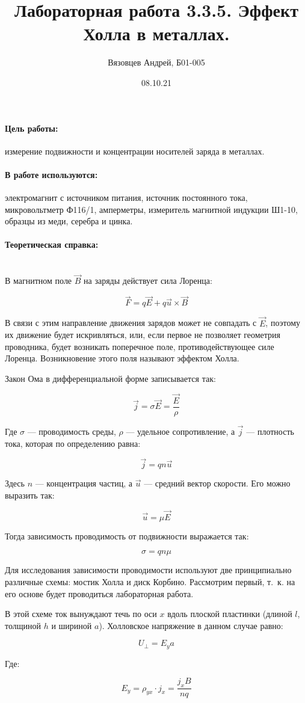 \documentclass[a4paper, 12pt]{article}
\author{Вязовцев Андрей, Б01-005}
\date{08.10.21}
\title{Лабораторная работа 3.3.5. Эффект Холла в металлах.}
\newcommand{\parag}[1]{\paragraph*{#1:}}
\begin{document}
\maketitle

\parag {Цель работы} измерение подвижности и концентрации носителей заряда в металлах.

\parag {В работе используются} электромагнит с источником питания, источник постоянного тока, микровольтметр Ф116/1, амперметры, измеритель магнитной индукции Ш1-10, образцы из меди, серебра и цинка.

\parag {Теоретическая справка} ~\\

В магнитном поле $\vec{B}$ на заряды действует сила Лоренца:

\[
    \vec{F} = q\vec{E} + q\vec{u} \times \vec{B}
\]

В связи с этим направление движения зарядов может не совпадать с $\vec{E}$, поэтому их движение будет искривляться, или, если первое не позволяет геометрия проводника, будет возникать поперечное поле, противодействующее силе Лоренца. Возникновение этого поля называют эффектом Холла.

Закон Ома в дифференциальной форме записывается так:

\[
    \vec{j} = \sigma \vec{E} = \frac{\vec{E}}{\rho}
\]

Где $\sigma$ --- проводимость среды, $\rho$ --- удельное сопротивление, а $\vec{j}$ --- плотность тока, которая по определению равна:

\[
    \vec{j} = q n \vec{u}
\]

Здесь $n$ --- концентрация частиц, а $\vec{u}$ --- средний вектор скорости. Его можно выразить так:

\[
    \vec{u} = \mu \vec{E}
\]

Тогда зависимость проводимость от подвижности выражается так:

\[
    \sigma = q n \mu
\]

Для исследования зависимости проводимости используют две принципиально различные схемы: мостик Холла и диск Корбино. Рассмотрим первый, т.~к. на его основе будет проводиться лабораторная работа.

В этой схеме ток вынуждают течь по оси $x$ вдоль плоской пластинки (длиной $l$, толщиной $h$ и шириной $a$). Холловское напряжение в данном случае равно:

\[
    U_{\perp} = E_y a
\]

Где:

\[
    E_y = \rho_{yx} \cdot j_x = \frac{j_x B}{n q}
\]
\end{document}
